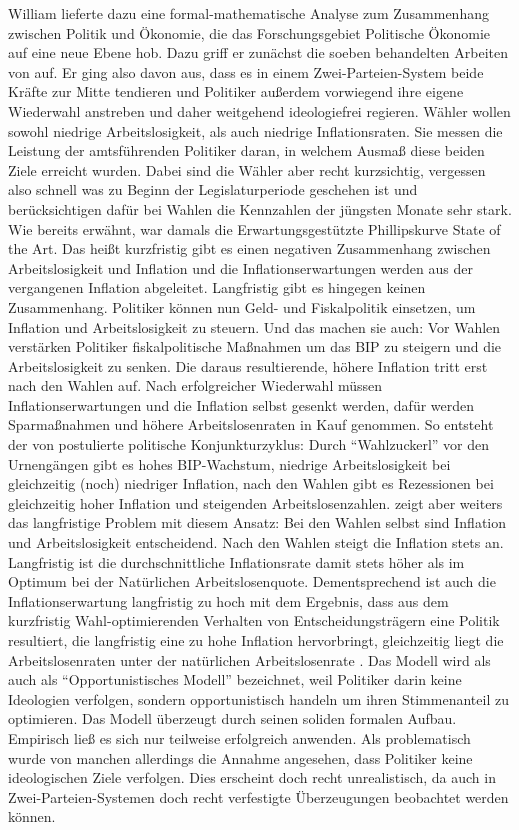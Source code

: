 William \textcite{Nordhaus1975} lieferte dazu eine formal-mathematische Analyse zum Zusammenhang zwischen Politik und Ökonomie, die das Forschungsgebiet Politische Ökonomie auf eine neue Ebene hob. Dazu griff er zunächst die soeben behandelten Arbeiten von \textcite{Downs1957, Downs1957b} auf. Er ging also davon aus, dass es in einem Zwei-Parteien-System beide Kräfte zur Mitte tendieren und Politiker außerdem vorwiegend ihre eigene Wiederwahl anstreben und daher weitgehend ideologiefrei regieren. Wähler wollen sowohl niedrige Arbeitslosigkeit, als auch niedrige Inflationsraten. Sie messen die Leistung der amtsführenden Politiker daran, in welchem Ausmaß diese beiden Ziele erreicht wurden. Dabei sind die Wähler aber recht kurzsichtig, vergessen also schnell was zu Beginn der Legislaturperiode geschehen ist und berücksichtigen dafür bei Wahlen die Kennzahlen der jüngsten Monate sehr stark. Wie bereits erwähnt, war damals die Erwartungsgestützte Phillipskurve State of the Art. Das heißt kurzfristig gibt es einen negativen Zusammenhang zwischen Arbeitslosigkeit und Inflation und die Inflationserwartungen werden aus der vergangenen Inflation abgeleitet. Langfristig gibt es hingegen keinen Zusammenhang. Politiker können nun Geld- und Fiskalpolitik einsetzen, um Inflation und Arbeitslosigkeit zu steuern. Und das machen sie auch: Vor Wahlen verstärken Politiker fiskalpolitische Maßnahmen um das BIP zu steigern und die Arbeitslosigkeit zu senken. Die daraus resultierende, höhere Inflation tritt erst nach den Wahlen auf. Nach erfolgreicher Wiederwahl müssen Inflationserwartungen und die Inflation selbst gesenkt werden, dafür werden Sparmaßnahmen und höhere Arbeitslosenraten in Kauf genommen. So entsteht der von \textcite{Nordhaus1975} postulierte politische Konjunkturzyklus: Durch "`Wahlzuckerl"' vor den Urnengängen gibt es hohes BIP-Wachstum, niedrige Arbeitslosigkeit bei gleichzeitig (noch) niedriger Inflation, nach den Wahlen gibt es Rezessionen bei gleichzeitig hoher Inflation und steigenden Arbeitslosenzahlen.
\textcite{Nordhaus1975} zeigt aber weiters das langfristige Problem mit diesem Ansatz: Bei den Wahlen selbst sind Inflation und Arbeitslosigkeit entscheidend. Nach den Wahlen steigt die Inflation stets an. Langfristig ist die durchschnittliche Inflationsrate damit stets höher als im Optimum bei der Natürlichen Arbeitslosenquote. Dementsprechend ist auch die Inflationserwartung langfristig zu hoch mit dem Ergebnis, dass aus dem kurzfristig Wahl-optimierenden Verhalten von Entscheidungsträgern eine Politik resultiert, die langfristig eine zu hohe Inflation hervorbringt, gleichzeitig liegt die Arbeitslosenraten unter der natürlichen Arbeitslosenrate \parencite{Nordhaus1975}. 
Das Modell wird als auch als "`Opportunistisches Modell"' bezeichnet, weil Politiker darin keine Ideologien verfolgen, sondern opportunistisch handeln um ihren Stimmenanteil zu optimieren. Das Modell überzeugt durch seinen soliden formalen Aufbau. Empirisch ließ es sich nur teilweise erfolgreich anwenden. Als problematisch wurde von manchen allerdings die Annahme angesehen, dass Politiker keine ideologischen Ziele verfolgen. Dies erscheint doch recht unrealistisch, da auch in Zwei-Parteien-Systemen doch recht verfestigte Überzeugungen beobachtet werden können.

